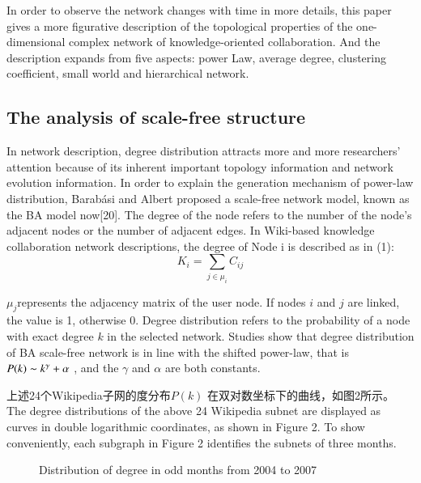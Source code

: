 \documentclass{elsarticle}
\begin{document}
In order to observe the network changes with time in more details, this paper gives a more figurative description of the topological properties of the one-dimensional complex network of knowledge-oriented collaboration. And the description expands from five aspects: power Law, average degree, clustering coefficient, small world and hierarchical network.

\subsection{The analysis of scale-free structure}
\label{sec:analysis-scale-free}

In network description, degree distribution attracts more and more researchers’ attention because of its inherent important topology information and network evolution information. In order to explain the generation mechanism of power-law distribution, Barabási and Albert proposed a scale-free network model, known as the BA model now[20].  The degree of the node refers to the number of the node's adjacent nodes or the number of adjacent edges. In Wiki-based knowledge collaboration network descriptions, the degree of Node i is described as in (1): 
\begin{equation}
  K_i=\sum_{j\in\mu_i}C_{ij}
\end{equation}

$\mu_j$represents the adjacency matrix of the user node. If nodes $i$
and $j$ are linked, the value  is 1, otherwise 0. Degree distribution
refers to the probability of a node with exact degree $k$ in the
selected network. Studies show that degree distribution of BA
scale-free network is in line with the shifted power-law, that is
$P(k)\thicksim k^\gamma+\alpha$  , and the $\gamma$ and $\alpha$ are both
constants. 

上述24个Wikipedia子网的度分布$P(k)$ 在双对数坐标下的曲线，如图2所示。
The degree distributions of the above 24 Wikipedia subnet are
displayed as curves in double logarithmic coordinates, as shown in
Figure 2. To show conveniently, each subgraph in Figure 2 identifies
the subnets of three months.
\begin{figure}[p]
  \centering
  \subfigure[a]{
     \scalebox{0.3}{\texttt{[image: 02-1]}}
   } \quad
  \subfigure[b]{ 
       \scalebox{0.3}{\texttt{[image: 02-2]}}
   } 
   \end{figure}
   \begin{figure}[p]
    \subfigure[c]{
     \scalebox{0.3}{\texttt{[image: 02-3]}}
   } \quad
  \subfigure[d]{ 
       \scalebox{0.3}{\texttt{[image: 02-4]}}
   } 
    \end{figure}
   \begin{figure}[p]
    \subfigure[e]{
     \scalebox{0.3}{\texttt{[image: 02-5]}}
   } \quad
  \subfigure[f]{ 
       \scalebox{0.3}{\texttt{[image: 02-6]}}
   } 
 \end{figure}
   \begin{figure}[p]
    \subfigure[g]{
     \scalebox{0.3}{\texttt{[image: 02-7]}}
   } \quad
  \subfigure[h]{ 
       \scalebox{0.3}{\texttt{[image: 02-8]}}
   } 
   \caption{Distribution of degree in odd months from 2004 to 2007}
\end{figure}
\end{document}
